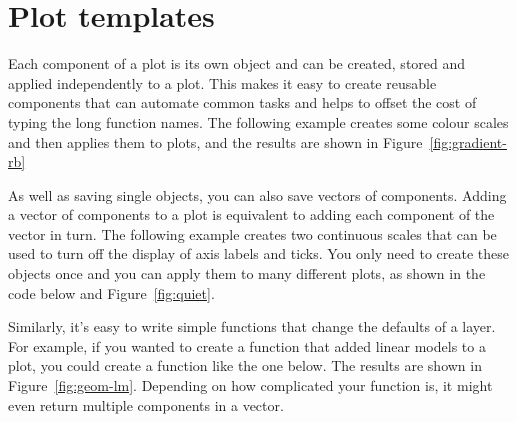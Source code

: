 % 


\section{Plot templates}
\label{sec:templates}

Each component of a \ggplot plot is its own object and can be created, stored and applied independently to a plot.  This makes it easy to create reusable components that can automate common tasks and helps to offset the cost of typing the long function names.  The following example creates some colour scales and then applies them to plots, and the results are shown in Figure~\ref{fig:gradient-rb}

% 


As well as saving single objects, you can also save vectors of \ggplot components.  Adding a vector of components to a plot is equivalent to adding each component of the vector in turn.  The following example creates two continuous scales that can be used to turn off the display of axis labels and ticks.  You only need to create these objects once and you can apply them to many different plots, as shown in the code below and Figure~\ref{fig:quiet}.

% 


Similarly, it's easy to write simple functions that change the defaults of a layer. For example, if you wanted to create a function that added linear models to a plot, you could create a function like the one below.  The results are shown in Figure~\ref{fig:geom-lm}.  Depending on how complicated your function is, it might even return multiple components in a vector.

